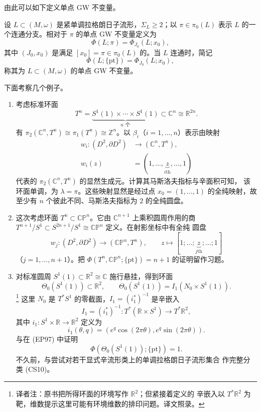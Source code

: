 由此可以如下定义单点 GW 不变量。

\begin{definition}
\label{def:one-point-open-gw-invariant}
设 $L\subset(M,\omega)$ 是紧单调拉格朗日子流形，$\Sigma_L\geq2$；以
$\pi\in\pi_0(L)$ 表示 $L$ 的一个连通分支。相对于 $\pi$ 的单点 GW 不变量定义为
\[
 \Phi(L;\pi)=\Phi_{J_0}(L;x_0),
\]
其中 $(J_0,x_0)$ 是满足 $[x_0]=\pi\in\pi_0(L)$ 的\termTransversePair{}。当 $L$ 连通时，简记
\[
 \Phi(L;\{\mathrm{pt}\})=\Phi_{J_0}(L;x_0),
\]
称其为 $L\subset(M,\omega)$ 的单点 GW 不变量。
\end{definition}

下面考察几个例子。

\begin{example}
\label{ex:one-point-open-gw-examples}
\begin{enumerate}[label=(\arabic*)]
\item {} 考虑标准环面
\[
 T^n=\underbrace{S^1(1)\times\cdots\times S^1(1)}_{n\text{ 个}}
 \subset\mathbb C^n\cong\mathbb R^{2n}.
\]
有 $\pi_2(\mathbb C^n,T^n)\cong\pi_1(T^n)\cong\mathbb Z^n$。以
$\beta_i$（$i=1,\ldots,n$）表示由映射
\[
 \begin{aligned}
 w_i:(D^2,\partial D^2)&\longrightarrow(\mathbb C^n,T^n),\\
 w_i(z)&=(1,\ldots,\underbrace{z}_{i\text{th}},\ldots,1)
 \end{aligned}
\]
代表的 $\pi_2(\mathbb C^n,T^n)$ 的显然生成元。计算其马斯洛夫指标与辛面积可知，
该环面单调，\termMonotonicityConstant{}为 $\lambda=\pi$。这些映射显然是经过点
$x_0=(1,\ldots,1)$ 的全纯映射，故至少有 $n$ 个彼此不同、马斯洛夫指标为 $2$
的全纯圆盘。

\item {} 这次考虑\personClifford{}环面
$T^n\subset\mathbb{CP}^n$。它由 $\mathbb C^{n+1}$ 上乘积圆周作用的商
$T^{n+1}/S^1\subset S^{2n+1}/S^1\cong\mathbb{CP}^n$ 定义。在射影坐标中有全纯
圆盘
\[
 w_j:(D^2,\partial D^2)\to(\mathbb{CP}^n,T^n),
 \qquad z\longmapsto[1;\ldots;\underbrace{z}_{j\text{th}};\ldots;1]
\]
（$j=1,\ldots,n+1$）。把
$\Phi(T^n,\mathbb{CP}^n;\{\mathrm{pt}\})=n+1$ 的证明留作习题。

\item {} 对标准圆周
$S^1(1)\subset\mathbb R^2\cong\mathbb C$ 施行\personChekanov{}悬挂，得到\personChekanov{}环面
\[
 \Theta_0(S^1(1))\subset\mathbb R^2,
 \qquad
 \Theta_0(S^1(1))=I_1(N_0\times S^1(1)).
\]
\footnote{译者注：原书把所得\personChekanov{}环面的环境写作 $\mathbb R^2$；但紧接着定义的
辛嵌入以 $T^*\mathbb R^2$ 为靶，维数提示这里可能有环境维数的排印问题。译文照录。}
这里 $N_0$ 是 $T^*S^1$ 的零截面，$I_1=(i_1^*)^{-1}$ 是辛嵌入
\[
 I_1=(i_1^*)^{-1}:T^*(\mathbb R\times S^1)\longrightarrow T^*\mathbb R^2,
\]
其中 $i_1:S^1\times\mathbb R\to\mathbb R^2$ 定义为
\[
 i_1(\theta,q)=(e^q\cos(2\pi\theta),e^q\sin(2\pi\theta)).
\]
\personEliashberg{}与\personPolterovich{}在 (EP97) 中证明
\[
 \Phi(\Theta_0(S^1(1));\{\mathrm{pt}\})=1.
\]
不久前，\personChekanov{}与\personSchlenk{}尝试对若干显式辛流形类上的单调拉格朗日子流形集合
作完整分类 (CS10)。
\end{enumerate}
\end{example}

